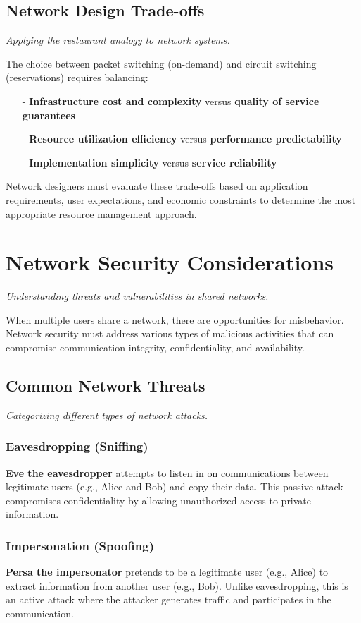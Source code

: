 \documentclass[../../compsys.tex]{subfiles}
\begin{document}
\subsection{Network Design Trade-offs}
\textit{Applying the restaurant analogy to network systems.}

The choice between packet switching (on-demand) and circuit switching (reservations) requires balancing:

\begin{itemize}
  \item[-] \textbf{Infrastructure cost and complexity} versus \textbf{quality of service guarantees}
  \item[-] \textbf{Resource utilization efficiency} versus \textbf{performance predictability}
  \item[-] \textbf{Implementation simplicity} versus \textbf{service reliability}
\end{itemize}

Network designers must evaluate these trade-offs based on application requirements, user expectations, and economic constraints to determine the most appropriate resource management approach.

\section{Network Security Considerations}
\textit{Understanding threats and vulnerabilities in shared networks.}

When multiple users share a network, there are opportunities for misbehavior. Network security must address various types of malicious activities that can compromise communication integrity, confidentiality, and availability.

\subsection{Common Network Threats}
\textit{Categorizing different types of network attacks.}

\subsubsection{Eavesdropping (Sniffing)}
\textbf{Eve the eavesdropper} attempts to listen in on communications between legitimate users (e.g., Alice and Bob) and copy their data. This passive attack compromises confidentiality by allowing unauthorized access to private information.

\subsubsection{Impersonation (Spoofing)}
\textbf{Persa the impersonator} pretends to be a legitimate user (e.g., Alice) to extract information from another user (e.g., Bob). Unlike eavesdropping, this is an active attack where the attacker generates traffic and participates in the communication.
\end{document}
